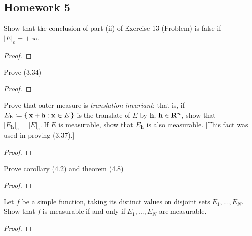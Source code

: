 \subsection{Homework 5}
\begin{problem}
Show that the conclusion of part  (ii) of Exercise 13 (Problem) is false if
$|E|_e=+\infty$.
\end{problem}
\begin{proof}
\end{proof}

\begin{problem}
Prove (3.34).
\end{problem}
\begin{proof}
\end{proof}

\begin{problem}
Prove that outer measure is \emph{translation invariant}; that is, if
$E_{\textbf{h}}\coloneqq\left\{\,\mathbf{x}+\mathbf{h}:\mathbf{x}\in
  E\,\right\}$ is the translate of $E$ by $\mathbf{h}$,
$\mathbf{h}\in\mathbf{R}^n$, show that
$|E_{\mathbf{h}}|_e=|E|_e$. If $E$ is measurable,
show that $E_{\mathbf{h}}$ is also measurable. [This fact was used in
proving (3.37).]
\end{problem}
\begin{proof}
\end{proof}

\begin{problem}
Prove corollary (4.2) and theorem (4.8)
\end{problem}
\begin{proof}
\end{proof}

\begin{problem}
Let $f$ be a simple function, taking its distinct values on disjoint sets
$E_1,...,E_N$. Show that $f$ is measurable if and only if $E_1,...,E_N$ are
measurable.
\end{problem}
\begin{proof}
\end{proof}

